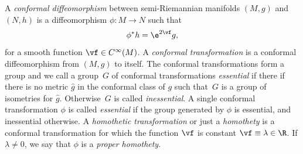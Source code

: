 A {\em conformal diffeomorphism} between semi-Riemannian manifolds $(M,g)$ and $(N,h)$ is a diffeomorphism
$\phi\colon M\to N$ such that
\[\phi^*h=\e^{2\vf}g,\]
for a smooth function $\vf\in C^\infty(M)$. A {\em conformal transformation} is a conformal diffeomorphism from $(M,g)$ to itself.
The conformal transformations form a group and we call a group~$G$ of conformal transformations {\em essential} if there
if there is no metric $\hat g$ in the conformal class of $g$ such that~$G$ is a group of isometries for $\hat g$. Otherwise~$G$ is called {\em inessential}.
A single conformal transformation $\phi$ is called {\em essential} if the group generated by $\phi$ is essential, and inessential otherwise.
A {\em homothetic transformation} or just a {\em homothety} is a conformal transformation for which the function $\vf$ is constant $\vf\equiv\lambda\in \R$.
If $\lambda\not=0$, we say that $\phi$ is a {\em proper homothety}.
